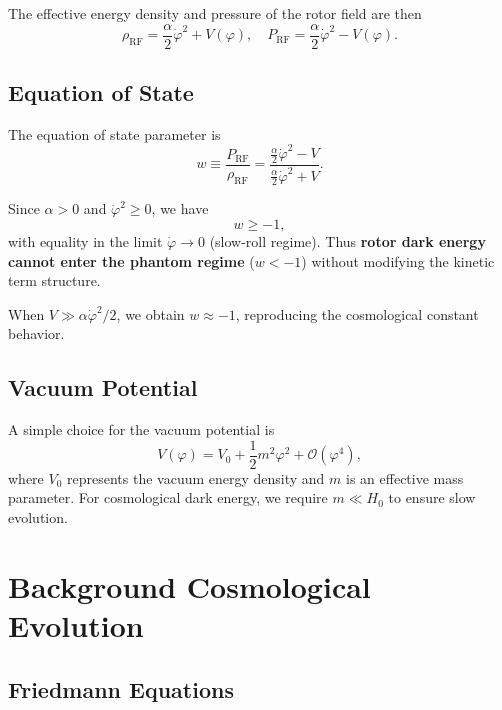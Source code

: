 \documentclass[11pt,a4paper]{article}
\numberwithin{equation}{section}
\theoremstyle{plain}
\theoremstyle{definition}
\theoremstyle{remark}
\begin{document}
The effective energy density and pressure of the rotor field are then
\begin{equation}
\rho_{\mathrm{RF}} = \frac{\alpha}{2}\dot{\varphi}^2 + V(\varphi),
\quad
P_{\mathrm{RF}} = \frac{\alpha}{2}\dot{\varphi}^2 - V(\varphi).
\label{eq:rho-P}
\end{equation}

\subsection{Equation of State}

The equation of state parameter is
\begin{equation}
w \equiv \frac{P_{\mathrm{RF}}}{\rho_{\mathrm{RF}}} = \frac{\frac{\alpha}{2}\dot{\varphi}^2 - V}{\frac{\alpha}{2}\dot{\varphi}^2 + V}.
\label{eq:eos}
\end{equation}

Since $\alpha > 0$ and $\dot{\varphi}^2 \geq 0$, we have
\begin{equation}
w \geq -1,
\end{equation}
with equality in the limit $\dot{\varphi} \to 0$ (slow-roll regime). Thus \textbf{rotor dark energy cannot enter the phantom regime} ($w < -1$) without modifying the kinetic term structure.

When $V \gg \alpha\dot{\varphi}^2/2$, we obtain $w \approx -1$, reproducing the cosmological constant behavior.

\subsection{Vacuum Potential}

A simple choice for the vacuum potential is
\begin{equation}
V(\varphi) = V_0 + \frac{1}{2}m^2\varphi^2 + \mathcal{O}(\varphi^4),
\label{eq:potential}
\end{equation}
where $V_0$ represents the vacuum energy density and $m$ is an effective mass parameter. For cosmological dark energy, we require $m \ll H_0$ to ensure slow evolution.

\section{Background Cosmological Evolution}
\label{sec:background}

\subsection{Friedmann Equations}
\end{document}
